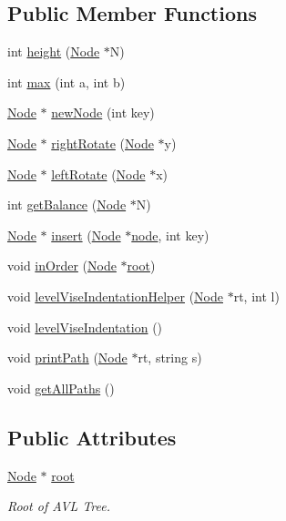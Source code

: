 \subsection*{Public Member Functions}
\begin{DoxyCompactItemize}
\item 
int \hyperlink{class_a_v_l_tree_a96cbfc11d7b61204423d22d4dec3cb39}{height} (\hyperlink{class_node}{Node} $\ast$N)
\item 
int \hyperlink{class_a_v_l_tree_ae5cd885ee0ad8a06a933bdac473c3cc5}{max} (int a, int b)
\item 
\hyperlink{class_node}{Node} $\ast$ \hyperlink{class_a_v_l_tree_a7d0da3880ea6b30f7df37547f99be642}{new\+Node} (int key)
\item 
\hyperlink{class_node}{Node} $\ast$ \hyperlink{class_a_v_l_tree_a735406d043d3dc61e0ed08455381487a}{right\+Rotate} (\hyperlink{class_node}{Node} $\ast$y)
\item 
\hyperlink{class_node}{Node} $\ast$ \hyperlink{class_a_v_l_tree_a8dc98844f7c4301e071bbc7c062ba9b5}{left\+Rotate} (\hyperlink{class_node}{Node} $\ast$x)
\item 
int \hyperlink{class_a_v_l_tree_aff1b11f5d1e3b013877c1fc1ace0b6a8}{get\+Balance} (\hyperlink{class_node}{Node} $\ast$N)
\item 
\hyperlink{class_node}{Node} $\ast$ \hyperlink{class_a_v_l_tree_adab09466d7b80c7b10eade93fca1b831}{insert} (\hyperlink{class_node}{Node} $\ast$\hyperlink{structnode}{node}, int key)
\item 
void \hyperlink{class_a_v_l_tree_a3dc3f18fce5d4124bfb94eb6cfa2e400}{in\+Order} (\hyperlink{class_node}{Node} $\ast$\hyperlink{class_a_v_l_tree_a3db9914a012a92648fc774b1112c79f0}{root})
\item 
void \hyperlink{class_a_v_l_tree_a4a917504798c964c12d6ea23bff6710c}{level\+Vise\+Indentation\+Helper} (\hyperlink{class_node}{Node} $\ast$rt, int l)
\item 
void \hyperlink{class_a_v_l_tree_a4717d25b108d9ad8d67258c75e44f696}{level\+Vise\+Indentation} ()
\item 
void \hyperlink{class_a_v_l_tree_a6fe238e7e0e458de06ee3357f5044e3a}{print\+Path} (\hyperlink{class_node}{Node} $\ast$rt, string s)
\item 
void \hyperlink{class_a_v_l_tree_acfeb6a8c2b2ddd309747a7f5d402e2ed}{get\+All\+Paths} ()
\end{DoxyCompactItemize}
\subsection*{Public Attributes}
\begin{DoxyCompactItemize}
\item 
\hyperlink{class_node}{Node} $\ast$ \hyperlink{class_a_v_l_tree_a3db9914a012a92648fc774b1112c79f0}{root}
\begin{DoxyCompactList}\small\item\em Root of A\+VL Tree. \end{DoxyCompactList}\end{DoxyCompactItemize}


